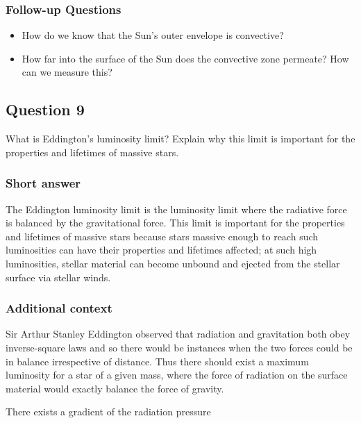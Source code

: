 \documentclass[a4paper,10pt]{article}
\begin{document}
\subsubsection{Follow-up Questions}

\begin{itemize}
    \item How do we know that the Sun's outer envelope is convective?
    \item How far into the surface of the Sun does the convective zone permeate? How can we measure this?
\end{itemize}


\newpage
\subsection{Question 9}

What is Eddington's luminosity limit? Explain why this limit is important for the properties and lifetimes of massive stars.

\subsubsection{Short answer}

The Eddington luminosity limit is the luminosity limit where the radiative force is balanced by the gravitational force. This limit is important for the properties and lifetimes of massive stars because stars massive enough to reach such luminosities can have their properties and lifetimes affected; at such high luminosities, stellar material can become unbound and ejected from the stellar surface via stellar winds.

\subsubsection{Additional context}

Sir Arthur Stanley Eddington observed that radiation and gravitation both obey inverse-square laws and so there would be instances when the two forces could be in balance irrespective of distance. Thus there should exist a maximum luminosity for a star of a given mass, where the force of radiation on the surface material would exactly balance the force of gravity.

{\noindent}There exists a gradient of the radiation pressure
\end{document}
